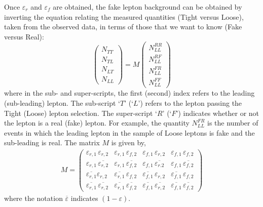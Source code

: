 Once $\varepsilon_r$ and $\varepsilon_f$ are obtained, the fake lepton background
can be obtained by inverting the equation relating the measured quantities (Tight versus Loose), taken
from the observed data, in terms
of those that we want to know (Fake versus Real):
\begin{equation}
    \begin{pmatrix}
        N_{TT} \\ N_{TL} \\ N_{LT} \\ N_{LL}
    \end{pmatrix}
        = M
    \begin{pmatrix}
        N_{LL}^{RR} \\ N_{LL}^{RF} \\ N_{LL}^{FR} \\ N_{LL}^{FF}
    \end{pmatrix}
    \label{eq:matrix_method}
\end{equation}
\noindent where in the sub- and super-scripts, the first (second) index refers to the leading (sub-leading) lepton.
The sub-script `$T$' (`$L$') refers to the lepton passing the Tight (Loose) lepton
selection.
The super-script `$R$' (`$F$') indicates whether or not the lepton is a real (fake) lepton.
For example, the quantity $N_{LL}^{FR}$ is the number of events in which the leading lepton
in the sample of Loose leptons is fake and the sub-leading is real.
The matrix $M$ is given by,
\begin{align}
    M = \begin{pmatrix}
            \varepsilon_{r,1}\,\varepsilon_{r,2} & \varepsilon_{r,1}\,\varepsilon_{f,2}  & \varepsilon_{f,1}\, \varepsilon_{r,2} & \varepsilon_{f,1}\, \varepsilon_{f,2} \\
            \varepsilon_{r,1}\, \overline{\varepsilon_{r,2}} & \varepsilon_{r,1}\,\overline{\varepsilon_{f,2}} & \varepsilon_{f,1}\, \overline{\varepsilon_{r.2}} & \varepsilon_{f,1}\, \overline{\varepsilon_{f,2}} \\
            \overline{\varepsilon_{r,1}} \varepsilon_{r,2} & \overline{\varepsilon_{r,1}}\, \varepsilon_{f,2} & \overline{\varepsilon_{f,1}}\, \varepsilon_{r,2} & \overline{\varepsilon_{f,1}}\, \varepsilon_{f,2} \\
            \overline{\varepsilon_{r,1}}\, \overline{\varepsilon_{r,2}} & \overline{\varepsilon_{r,1}}\, \overline{\varepsilon_{f,2}} & \overline{\varepsilon_{f,1}}\, \overline{\varepsilon_{r,2}} & \overline{\varepsilon_{f,1}}\, \overline{\varepsilon_{f,2}}
        \end{pmatrix}
    \label{eq:matrix_method_matrix}
\end{align}
where the notation $\overline{\varepsilon}$ indicates $(1 - \varepsilon)$.

